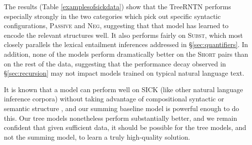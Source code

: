 The results (Table \ref{examplesofsickdata}) show that the TreeRNTN performs especially strongly in the two categories which pick out specific syntactic configurations, \textsc{Passive} and \textsc{Neg}, suggesting that that model has learned to encode the relevant structures well. It also performs fairly on \textsc{Subst}, which most closely parallels the lexical entailment inferences addressed in \S\ref{sec:quantifiers}. In addition, none of the models perform dramatically better on the \textsc{Short} pairs than on the rest of the data, suggesting that the performance decay observed in \S\ref{sec:recursion} may not impact models trained on typical natural language text.

It is known that a model can perform well on SICK (like other natural language inference corpora) without taking advantage of compositional syntactic or semantic structure \cite{marelli2014semeval}, and our summing baseline model is powerful enough to do this. Our tree models nonetheless perform substantially better, and we remain confident that given sufficient data, it should be possible for the tree models, and not the summing model, to learn a truly high-quality solution.
